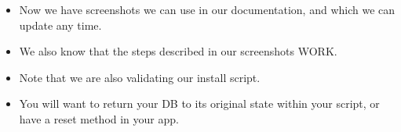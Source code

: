 \documentclass{beamer}
\begin{document}
\begin{frame}{}
\begin{itemize}
\item{Now we have screenshots we can use in our documentation, and which we can update any time.}
\item{We also know that the steps described in our screenshots WORK.}
\item{Note that we are also validating our install script.}
\item{You will want to return your DB to its original state within your script, or have a reset method in your app.}
\end{itemize}
\end{frame}
\end{document}

